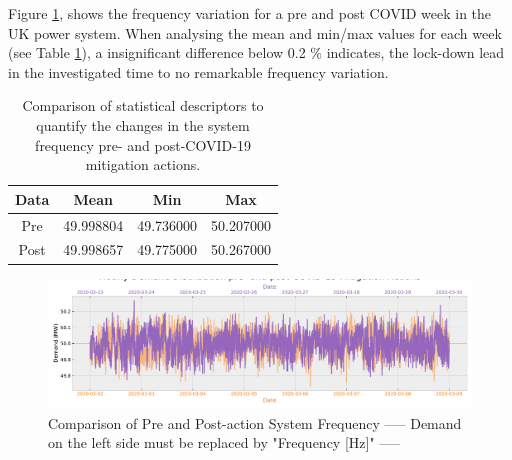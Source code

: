 \documentclass[energies,article,submit,moreauthors,pdftex]{Definitions/mdpi}
\begin{document}
Figure \ref{fig:freq_weekly}, shows the frequency variation for a pre and post COVID week in the UK power system. When analysing the mean and min/max values for each week (see Table \ref{table:fre_table}), a insignificant difference below 0.2 \% indicates, the lock-down lead in the investigated time to no remarkable frequency variation.  


\begin{table}[H]
\caption{Comparison of statistical descriptors to quantify the changes in the system frequency pre- and post-COVID-19 mitigation actions.}\label{table:fre_table}
\centering
\begin{tabular}{cccc}
\toprule
\textbf{Data} & \textbf{Mean}	& \textbf{Min}	& \textbf{Max}\\
\midrule
Pre		& 49.998804			& 49.736000         & 50.207000\\
Post	& 49.998657			& 49.775000         &50.267000\\

\bottomrule
\end{tabular}
\end{table}


\begin{figure}[H]
\centering
\hspace{-25pt}\includegraphics[width=16.5 cm]{Graphics/Freq_pre_post_weekly.pdf}
\caption{Comparison of Pre and Post-action System Frequency  ----- Demand on the left side must be replaced by "Frequency [Hz]" -----} \label{fig:freq_weekly}
\end{figure}  
\end{document}
